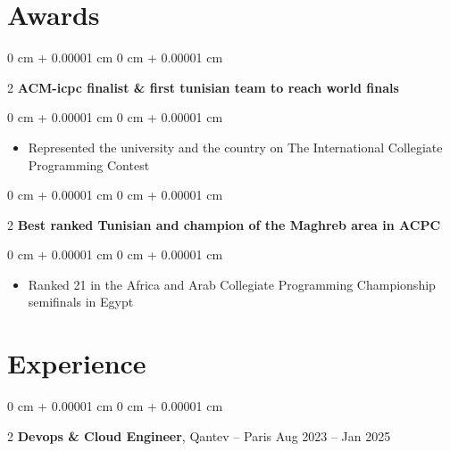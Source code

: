\documentclass[10pt, letterpaper]{article}
\newenvironment{highlights}{ \begin{itemize}[ topsep=0.10 cm, parsep=0.10 cm, partopsep=0pt,
itemsep=0pt, leftmargin=0 cm + 10pt ] }{ \end{itemize} } %
\newenvironment{onecolentry}{ \begin{adjustwidth}{ 0 cm + 0.00001 cm }{ 0 cm + 0.00001 cm }
}{ \end{adjustwidth} } %
\newenvironment{twocolentry}[2][]{ \onecolentry \def\secondColumn{#2} \setcolumnwidth{\fill, 4.5 cm}
\begin{paracol}{2} }{ \switchcolumn \raggedleft \secondColumn \end{paracol}
\endonecolentry } %
\begin{document}
\section{Awards}

\begin{twocolentry}
	{ 2021 } \textbf{ACM-icpc finalist \& first tunisian team to reach world
		finals}
\end{twocolentry}

\vspace{0.10 cm}
\begin{onecolentry}
	\begin{highlights}
		\item Represented the university and the country on The International Collegiate
		Programming Contest
	\end{highlights}
\end{onecolentry}

\vspace{0.20 cm}
\begin{twocolentry}
	{ 2019 } \textbf{Best ranked Tunisian and champion of the Maghreb area in
		ACPC}
\end{twocolentry}

\vspace{0.10 cm}
\begin{onecolentry}
	\begin{highlights}
		\item Ranked 21 in the Africa and Arab Collegiate Programming Championship
		semifinals in Egypt
	\end{highlights}
\end{onecolentry}

\section{Experience}

\vspace{0.10 cm}

\begin{twocolentry}
	{ Aug 2023 – Jan 2025 } \textbf{Devops \& Cloud Engineer}, Qantev -- Paris
\end{twocolentry}
\end{document}
